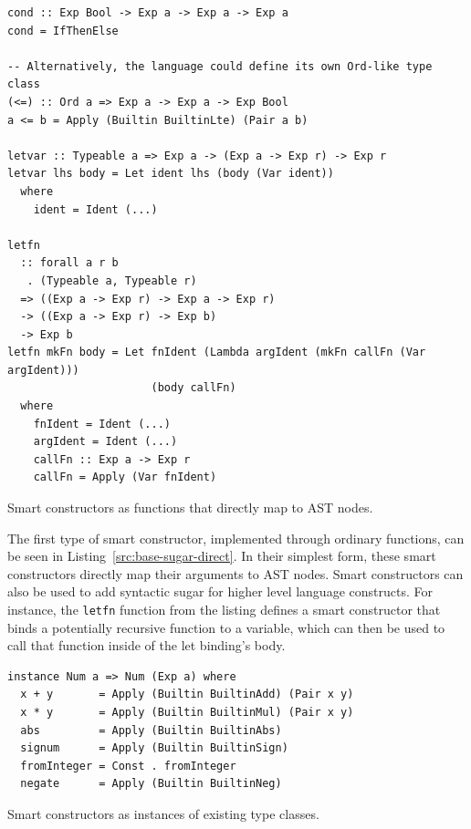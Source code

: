 \documentclass[fontsize=11pt,a4paper,parskip=half,numbers=noenddot]{scrartcl}
\newcommand{\hask}[1]{\texttt{#1}}
\begin{document}

\begin{listing}[!ht]
\begin{verbatim}
cond :: Exp Bool -> Exp a -> Exp a -> Exp a
cond = IfThenElse

-- Alternatively, the language could define its own Ord-like type class
(<=) :: Ord a => Exp a -> Exp a -> Exp Bool
a <= b = Apply (Builtin BuiltinLte) (Pair a b)

letvar :: Typeable a => Exp a -> (Exp a -> Exp r) -> Exp r
letvar lhs body = Let ident lhs (body (Var ident))
  where
    ident = Ident (...)

letfn
  :: forall a r b
   . (Typeable a, Typeable r)
  => ((Exp a -> Exp r) -> Exp a -> Exp r)
  -> ((Exp a -> Exp r) -> Exp b)
  -> Exp b
letfn mkFn body = Let fnIdent (Lambda argIdent (mkFn callFn (Var argIdent)))
                      (body callFn)
  where
    fnIdent = Ident (...)
    argIdent = Ident (...)
    callFn :: Exp a -> Exp r
    callFn = Apply (Var fnIdent)
\end{verbatim}
\caption{Smart constructors as functions that directly map to AST nodes.}\label{src:base-sugar-direct}
\end{listing}

The first type of smart constructor, implemented through ordinary functions, can
be seen in Listing~\ref{src:base-sugar-direct}. In their simplest form, these
smart constructors directly map their arguments to AST nodes. Smart constructors
can also be used to add syntactic sugar for higher level language constructs.
For instance, the \hask{letfn} function from the listing defines a smart
constructor that binds a potentially recursive function to a variable, which can
then be used to call that function inside of the let binding's body.

\label{sec:language-smart-constructors-type-classes}

\begin{listing}[!ht]
\begin{verbatim}
instance Num a => Num (Exp a) where
  x + y       = Apply (Builtin BuiltinAdd) (Pair x y)
  x * y       = Apply (Builtin BuiltinMul) (Pair x y)
  abs         = Apply (Builtin BuiltinAbs)
  signum      = Apply (Builtin BuiltinSign)
  fromInteger = Const . fromInteger
  negate      = Apply (Builtin BuiltinNeg)
\end{verbatim}
\caption{Smart constructors as instances of existing type classes.}\label{src:base-sugar-type-class}
\end{listing}
\end{document}
